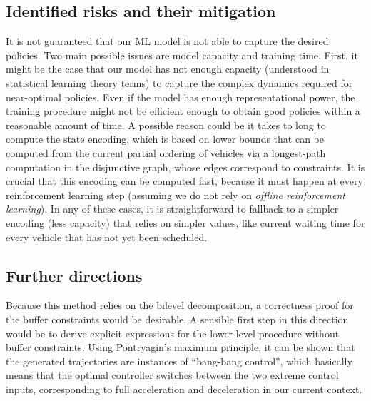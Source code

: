 \documentclass[a4paper]{article}
\theoremstyle{definition}
\theoremstyle{plain}
\begin{document}
\subsection*{Identified risks and their mitigation}

It is not guaranteed that our ML model is not able to capture the desired
policies. Two main possible issues are model capacity and training time. First,
it might be the case that our model has not enough capacity (understood in
statistical learning theory terms) to capture the complex dynamics required for
near-optimal policies.
Even if the model has enough representational power, the training procedure
might not be efficient enough to obtain good policies within a reasonable amount
of time. A possible reason could be it takes to long to compute the state
encoding,
which is based on lower bounds that can be computed from the current partial
ordering of vehicles via a longest-path computation in the disjunctive graph,
whose edges correspond to constraints. It is crucial that this encoding can be
computed fast, because it must happen at every reinforcement learning step
(assuming we do not rely on \textit{offline reinforcement learning}).
%
In any of these cases, it is straightforward to fallback to a simpler encoding
(less capacity) that relies on simpler values, like current waiting time for
every vehicle that has not yet been scheduled.


\subsection*{Further directions}

Because this method relies on the bilevel decomposition, a correctness proof for
the buffer constraints would be desirable. A sensible first step in this
direction would be to derive explicit expressions for the lower-level procedure
without buffer constraints. Using Pontryagin's maximum principle, it can be
shown that the generated trajectories are instances of ``bang-bang control'',
which basically means that the optimal controller switches between the two
extreme control inputs, corresponding to full acceleration and deceleration in
our current context.

%
\end{document}
